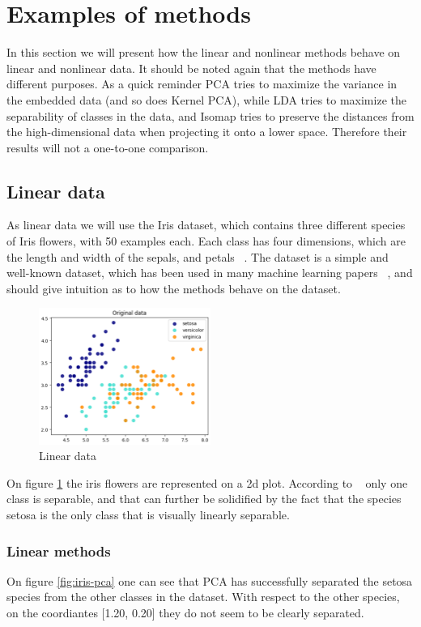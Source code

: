 \section{Examples of methods}
In this section we will present how the linear and nonlinear methods behave on linear and nonlinear data. It should be noted again that the methods have different purposes. As a quick reminder PCA tries to maximize the variance in the embedded data (and so does Kernel PCA), while LDA tries to maximize the separability of classes in the data, and Isomap tries to preserve the distances from the high-dimensional data when projecting it onto a lower space. Therefore their results will not a one-to-one comparison.


\subsection{Linear data}
As linear data we will use the Iris dataset, which contains three different species of Iris flowers, with 50 examples each. Each class has four dimensions, which are the length and width of the sepals, and petals ~\cite{iris-dataset}. The dataset is a simple and well-known dataset, which has been used in many machine learning papers ~\cite{iris-dataset}, and should give intuition as to how the methods behave on the dataset.

\begin{figure}[h]
\centering
\includegraphics[width=0.5\textwidth]{figures/theory-example-figures/linear-data.png}
\caption{Linear data}
\label{fig:linear-data}
\end{figure}

On figure \ref{fig:linear-data} the iris flowers are represented on a 2d plot. According to ~\cite{iris-dataset} only one class is separable, and that can further be  solidified by the fact that the species setosa is the only class that is visually linearly separable.

\subsubsection{Linear methods}
On figure \ref{fig:iris-pca} one can see that PCA has successfully separated the setosa species from the other classes in the dataset. With respect to the other species, on the coordiantes [1.20, 0.20] they do not seem to be clearly separated.

